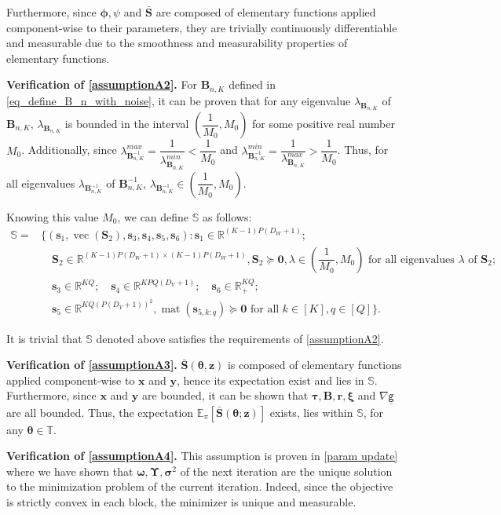 \documentclass{article}
\newcommand{\zero}{\ensuremath{\mathbf{0}}}
\DeclareMathOperator*{\vect}{vec} %
\DeclareMathOperator*{\mat}{mat}
\def\phib        {{\sbmm{\phi}}\XS}        \def\Phib       {{\sbmm{\Phi}}\XS}
\def\XS{\xspace}
\def\sbmm#1{\ensuremath{\boldsymbol{#1}}}
\def\PE{\mathbb{E}_\pi} %
\def\bars{\bar{\vS}}
\def\sfg{\mathsf{g}}
\def\rvz{{\mathbf{z}}}
\def\vxi{{\bm{\xi}}}
\def\vtau{{\bm{\tau}}}
\def\vsigma{{\bm{\sigma}}}
\def\vomega{{\bm{\omega}}}
\def\vtheta{{\bm{\theta}}}
\def\vr{{\bm{r}}}
\def\vs{{\bm{s}}}
\def\vS{{\bm{S}}}
\def\vx{{\bm{x}}}
\def\vy{{\bm{y}}}
\def\vz{{\bm{z}}}
\def\mB{{\bm{B}}}
\def\mS{{\bm{S}}}
\def\mUpsilon{{\bm{\Upsilon}}}
\def\sR{{\mathbb{R}}}
\def\sS{{\mathbb{S}}}
\def\sT{{\mathbb{T}}}
\begin{document}
Furthermore, since $\phib,\psi$ and $\bars$ are composed of elementary functions applied component-wise to their parameters, they are trivially continuously differentiable and measurable due to the smoothness and measurability properties of elementary functions.

\textbf{Verification of \cref{assumptionA2}.} For $\mB_{n,K}$ defined in \cref{eq_define_B_n_with_noise}, it can be proven that for any eigenvalue $\lambda_{\mB_{n,K}}$ of $\mB_{n,K}$, $\lambda_{\mB_{n,K}}$ is bounded in the interval $\left(\dfrac{1}{M_0},M_0\right)$ for some positive real number $M_0$. Additionally, since $\lambda^{max}_{\mB_{n,K}^{-1}}=\dfrac{1}{\lambda^{min}_{\mB_{n,K}}}<\dfrac{1}{M_0}$ and $\lambda^{min}_{\mB_{n,K}^{-1}}=\dfrac{1}{\lambda^{max}_{\mB_{n,K}}}>\dfrac{1}{M_0}$. Thus, for all eigenvalues $\lambda_{\mB_{n,K}^{-1}}$ of $\mB_{n,K}^{-1}$, $\lambda_{\mB_{n,K}^{-1}}\in\left(\dfrac{1}{M_0},M_0\right)$.
\par Knowing this value $M_0$, we can define $\mathbb{S}$ as follows:
\begin{align}\label{eq_define_S2}
    \mathbb{S}=&\big\{(\vs_1, \vect(\mS_2),\vs_3, \vs_4, \vs_5, \vs_6):  \vs_1\in \sR^{(K-1)P(D_W+1)};\nonumber\\
    &\quad \mS_2\in \sR^{(K-1)P(D_W+1)\times (K-1)P(D_W+1)}, \mS_2 \succeq \zero, \lambda \in \left(\dfrac{1}{M_0},M_0\right) \text{ for all eigenvalues $\lambda$ of } \mS_2;\nonumber\\
    &\quad \vs_3 \in \sR^{KQ}; \quad \vs_4\in \sR^{KPQ(D_V+1)}; \quad \vs_6\in\sR_{+}^{KQ};\nonumber\\
    &\quad \vs_5\in \sR^{KQ(P(D_V+1))^2}, \mat(\vs_{5,k:q}) \succeq \zero \text{ for all $k\in[K],q\in [Q]$}\big\}.
\end{align}

It is trivial that $\mathbb{S}$ denoted above satisfies the requirements of \cref{assumptionA2}.

\textbf{Verification of \cref{assumptionA3}.} $\bars(\vtheta,\vz)$ is composed of elementary functions applied component-wise to $\vx$ and $\vy$, hence its expectation exist and lies in $\mathbb{S}$. Furthermore, since $\vx$ and $\vy$ are bounded, it can be shown that $\vtau,\mB,\vr,\vxi$ and $\nabla \underline{\sfg}$ are all bounded. Thus, the expectation $\PE[\bars(\vtheta; \rvz)]$ exists, lies within $\sS$, for any $\vtheta \in \sT$.

\textbf{Verification of \cref{assumptionA4}.} This assumption is proven in \cref{param update} where we have shown that $\vomega,\mUpsilon,\vsigma^2$ of the next iteration are the unique solution to the minimization problem of the current iteration. Indeed, since the objective is strictly convex in each block, the minimizer is unique and measurable.
\end{document}
